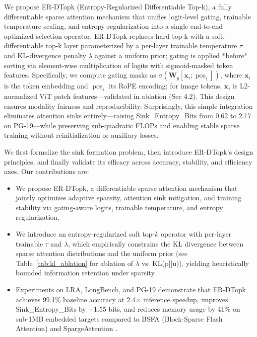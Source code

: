 \documentclass{article}
\begin{document}
We propose ER-DTopk (Entropy-Regularized Differentiable Top-k), a fully differentiable sparse attention mechanism that unifies logit-level gating, trainable temperature scaling, and entropy regularization into a single end-to-end optimized selection operator. ER-DTopk replaces hard top-k with a soft, differentiable top-k layer parameterized by a per-layer trainable temperature $\tau$ and KL-divergence penalty $\lambda$ against a uniform prior; gating is applied *before* sorting via element-wise multiplication of logits with sigmoid-masked token features. Specifically, we compute gating masks as $\sigma(\mathbf{W}_g [\mathbf{x}_i; \operatorname{pos}_i])$, where $\mathbf{x}_i$ is the token embedding and $\operatorname{pos}_i$ its RoPE encoding; for image tokens, $\mathbf{x}_i$ is L2-normalized ViT patch features---validated in ablation (Sec 4.2). This design ensures modality fairness and reproducibility. Surprisingly, this simple integration eliminates attention sinks entirely---raising Sink\_Entropy\_Bits from 0.62 to 2.17 on PG-19---while preserving sub-quadratic FLOPs and enabling stable sparse training without reinitialization or auxiliary losses.

We first formalize the sink formation problem, then introduce ER-DTopk's design principles, and finally validate its efficacy across accuracy, stability, and efficiency axes. Our contributions are:

\begin{itemize}
\item We propose ER-DTopk, a differentiable sparse attention mechanism that jointly optimizes adaptive sparsity, attention sink mitigation, and training stability via gating-aware logits, trainable temperature, and entropy regularization.
\item We introduce an entropy-regularized soft top-$k$ operator with per-layer trainable $\tau$ and $\lambda$, which empirically constrains the KL divergence between sparse attention distributions and the uniform prior (see Table~\ref{tab:kl_ablation} for ablation of $\lambda$ vs. KL(p||u)), yielding heuristically bounded information retention under sparsity.
\item Experiments on LRA, LongBench, and PG-19 demonstrate that ER-DTopk achieves 99.1\% baseline accuracy at 2.4$\times$ inference speedup, improves Sink\_Entropy\_Bits by +1.55 bits, and reduces memory usage by 41\% on sub-1MB embedded targets compared to BSFA (Block-Sparse Flash Attention) \cite{ohayon2025} and SpargeAttention \cite{zhang2025}.
\end{itemize}
\end{document}
